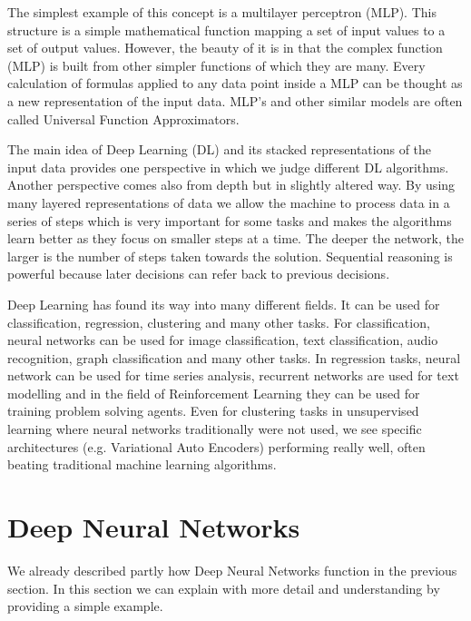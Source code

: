 \documentclass[b5paper]{book}
\begin{document}
The simplest example of this concept is a multilayer perceptron (MLP). This structure is a simple mathematical function mapping a set of input values to a set of output values. However, the beauty of it is in that the complex function (MLP) is built from other simpler functions of which they are many. Every calculation of formulas applied to any data point inside a MLP can be thought as a new representation of the input data. MLP's and other similar models are often called Universal Function Approximators. 

The main idea of Deep Learning (DL) and its stacked representations of the input data provides one perspective in which we judge different DL algorithms. Another perspective comes also from depth but in slightly altered way. By using many layered representations of data we allow the machine to process data in a series of steps which is very important for some tasks and makes the algorithms learn better as they focus on smaller steps at a time. The deeper the network, the larger is the number of steps taken towards the solution. Sequential reasoning is powerful because later decisions can refer back to previous decisions. 


Deep Learning has found its way into many different fields. It can be used for classification, regression, clustering and many other tasks. For classification, neural networks can be used for image classification, text classification, audio recognition, graph classification and many other tasks. In regression tasks, neural network can be used for time series analysis, recurrent networks are used for text modelling and in the field of Reinforcement Learning they can be used for training problem solving agents. Even for clustering tasks in unsupervised learning where neural networks traditionally were not used, we see specific architectures (e.g. Variational Auto Encoders) performing really well, often beating traditional machine learning algorithms.

\section{Deep Neural Networks}

We already described partly how Deep Neural Networks function in the previous section. In this section we can explain with more detail and understanding by providing a simple example.
\end{document}
